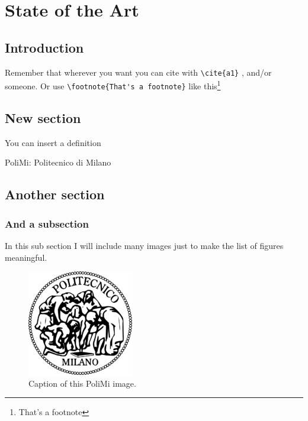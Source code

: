 \chapter{State of the Art}

\section{Introduction}\label{sec:i}
Remember that wherever you want you can cite with \verb.\cite{a1}. \cite{a1}, \cite{b1} and/or \cite{m1} someone.
Or use \verb.\footnote{That's a footnote}. like this\footnote{That's a footnote} 


\section{New section}
You can insert a definition
	\begin{Definition}
		PoliMi: Politecnico di Milano
	\end{Definition}
	
\section{Another section}
	\subsection{And a subsection}
		In this sub section I will include many images just to make the list of figures meaningful.

			\begin{figure}[h!tb]
				\centerline {\includegraphics[scale=0.6]{img/logopoli.png}}
				\caption{Caption of this PoliMi image.}
				\label{fig:leet}
			\end{figure}


